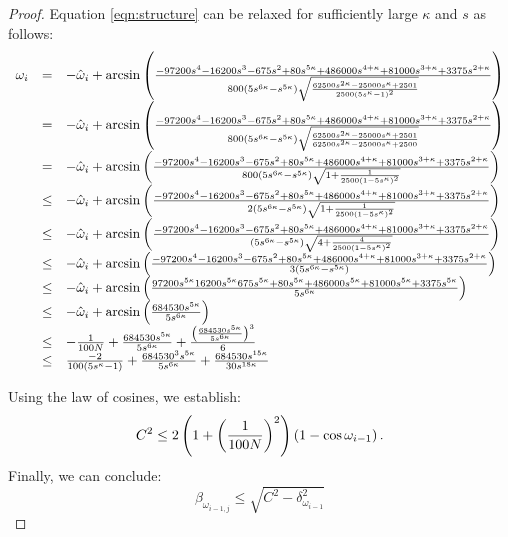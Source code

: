 \begin{proof}
Equation \ref{eqn:structure} can be relaxed for sufficiently large $\kappa$ and $s$ as follows:
 \begin{equation}\label{eqn:relaxedStructure}
 \begin{array}{rcl}
 \omega_i &=& -\hat{\omega}_i + \arcsin \left(  \frac{-97200s^4
-16200s^3
-675s^2+
80s^{5\kappa}+
486000s^{4+\kappa}+
81000s^{3+\kappa}+
3375s^{2+\kappa}}{800\left(5  s^{6  \kappa} - s^{5  \kappa}\right)
			\sqrt{
				\frac{62500 s^{2\kappa} - 25000 s^\kappa + 2501}{2500\left( 5s^\kappa - 1 \right)^2}
			 }
 }
 \right)\\
 &=& -\hat{\omega}_i + \arcsin \left(  \frac{-97200s^4
-16200s^3
-675s^2+
80s^{5\kappa}+
486000s^{4+\kappa}+
81000s^{3+\kappa}+
3375s^{2+\kappa}}{800\left(5  s^{6  \kappa} - s^{5  \kappa}\right)
			\sqrt{
				\frac{62500 s^{2\kappa} - 25000 s^\kappa + 2501}{62500 s^{2\kappa}-25000 s^\kappa +2500}
			 }
 }
 \right)\\
 &=& -\hat{\omega}_i + \arcsin \left(  \frac{-97200s^4
-16200s^3
-675s^2+
80s^{5\kappa}+
486000s^{4+\kappa}+
81000s^{3+\kappa}+
3375s^{2+\kappa}}{800\left(5  s^{6  \kappa} - s^{5  \kappa}\right)
			\sqrt{
				1+ \frac{1}{2500 \left( 1-5s^\kappa \right)^2}
			 }
 }
 \right)\\
 &\leq& -\hat{\omega}_i + \arcsin \left(  \frac{-97200s^4
-16200s^3
-675s^2+
80s^{5\kappa}+
486000s^{4+\kappa}+
81000s^{3+\kappa}+
3375s^{2+\kappa}}{2\left(5  s^{6  \kappa} - s^{5  \kappa}\right)
			\sqrt{
				1+ \frac{1}{2500 \left( 1-5s^\kappa \right)^2}
			 }
 }
 \right)\\
 &\leq& -\hat{\omega}_i + \arcsin \left(  \frac{-97200s^4
-16200s^3
-675s^2+
80s^{5\kappa}+
486000s^{4+\kappa}+
81000s^{3+\kappa}+
3375s^{2+\kappa}}{\left(5  s^{6  \kappa} - s^{5  \kappa}\right)
			\sqrt{
				4+ \frac{4}{2500 \left( 1-5s^\kappa \right)^2}
			 }
 }
 \right)\\
 &\leq& -\hat{\omega}_i + \arcsin \left(  \frac{-97200s^4
-16200s^3
-675s^2+
80s^{5\kappa}+
486000s^{4+\kappa}+
81000s^{3+\kappa}+
3375s^{2+\kappa}}{3\left(  5  s^{6 \kappa} - s^{5 \kappa}  \right) } 
 \right)\\
 &\leq& -\hat{\omega}_i + \arcsin \left(  \frac{
97200s^{5\kappa}
16200s^{5\kappa}
675s^{5\kappa}+
80s^{5\kappa}+
486000s^{5\kappa}+
81000s^{5\kappa}+
3375s^{5\kappa}}{ 5  s^{6 \kappa} } 
 \right)\\
 &\leq& -\hat{\omega}_i + \arcsin \left(  \frac{684530s^{5\kappa}}{ 5  s^{6 \kappa} } 
 \right)\\
&\leq& -\frac{1}{100N} + \frac{684530s^{5\kappa}}{ 5  s^{6 \kappa} } + \frac{\left( \frac{684530s^{5\kappa}}{5  s^{6 \kappa}} \right)^3}{6}\\
&\leq& \frac{-2}{100 \left( 5 s^\kappa - 1 \right)} + \frac{684530^3s^{5\kappa}}{ 5  s^{6 \kappa}} + \frac{684530s^{15\kappa}}{ 30  s^{18 \kappa}}
\end{array}
\end{equation}

Using the law of cosines, we establish:
$$C^2 \leq 2 \left( 1 + \left( \frac{1}{100N} \right)^2 \right) \left( 1 - \cos\omega_{i-1} \right).$$
Finally, we can conclude:
$$\beta_{\omega_{i-1,j}} \leq \sqrt{C^2 - \delta_{\omega_{i-1}}^2}$$
\end{proof}

